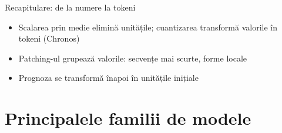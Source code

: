 \begin{frame}{Recapitulare: de la numere la tokeni}
\itemsize{\small}
\begin{itemize}
    \item Scalarea prin medie elimină unitățile; cuantizarea transformă valorile în tokeni (Chronos)
    \item Patching-ul grupează valorile: secvențe mai scurte, forme locale
    \item Prognoza se transformă înapoi în unitățile inițiale
\end{itemize}
\end{frame}


\section{Principalele familii de modele}

